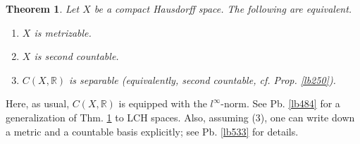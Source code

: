 \documentclass[12pt,b5paper,notitlepage]{article}
\theoremstyle{definition}
\theoremstyle{plain}
\newtheorem{thm}[df]{Theorem}
\newcommand{\Rbb}{\mathbb R}
\numberwithin{equation}{section}
\begin{document}
\begin{thm}\label{lb482}
Let $X$ be a compact Hausdorff space. The following are equivalent.
\begin{enumerate}[label=(\arabic*)]
\item $X$ is metrizable.
\item $X$ is second countable.
\item $C(X,\Rbb)$ is separable (equivalently, second countable, cf. Prop. \ref{lb250}).
\end{enumerate}
\end{thm}

Here, as usual, $C(X,\Rbb)$ is equipped with the $l^\infty$-norm. See Pb. \ref{lb484} for a generalization of Thm. \ref{lb482} to LCH spaces. Also, assuming (3), one can write down a metric and a countable basis explicitly; see Pb. \ref{lb533} for details.
\end{document}
